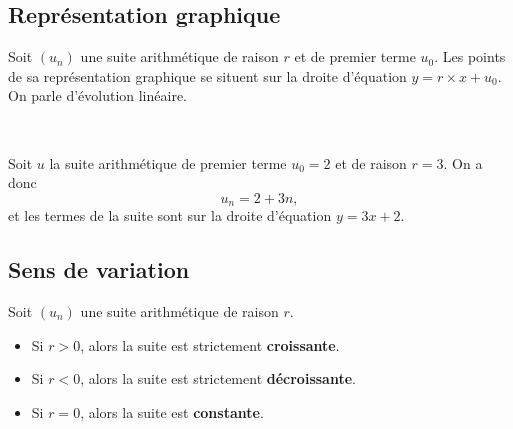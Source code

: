 \documentclass[11pt]{article}
\begin{document}
\subsection{Représentation graphique}
\begin{prop}
  Soit $\left( u_n \right)$ une suite arithmétique de raison $r$ et de premier
  terme $u_0$. Les points de sa représentation graphique se situent sur la
  droite d'équation $y=r\times x+u_0$. On parle d'évolution linéaire.
\end{prop}

\begin{exemple}~\\[-5mm]
  \begin{minipage}[]{.5\textwidth}
    Soit $u$ la suite arithmétique de premier terme $u_0=2$ et de raison $r=3$.
    On a donc
    \[
      u_n = 2+3n,
    \]
    et les termes de la suite sont sur la droite d'équation $y = 3x+2$.
  \end{minipage}
  \begin{minipage}[]{.5\textwidth}
      \begin{center}
  \end{center}
  \end{minipage}
\end{exemple}

\subsection{Sens de variation}
\begin{prop}
  Soit $\left( u_n \right)$ une suite arithmétique de raison $r$.
  \begin{itemize}
    \item Si $r>0$, alors la suite est strictement \textbf{croissante}.
    \item Si $r<0$, alors la suite est strictement \textbf{décroissante}.
    \item Si $r=0$, alors la suite est \textbf{constante}.
  \end{itemize}
\end{prop}
\end{document}
